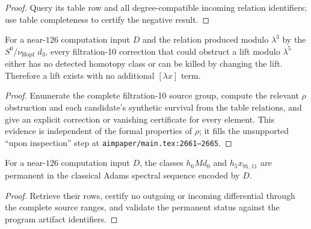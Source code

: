 \begin{proof}
  Query its table row and all degree-compatible incoming relation identifiers;
  use table completeness to certify the negative result.
\end{proof}

\begin{proposition}
  \label{evidence:nu-extension-obstruction-vanishing}
  \notready
  For a near-$126$ computation input $D$ and the relation produced modulo
  $\lambda^3$ by the $S^0/\nu_{\mathrm{Hopf}}$
  $d_3$, every filtration-10 correction that could obstruct a lift modulo
  $\lambda^5$ either has no detected homotopy class or can be killed by changing
  the lift.  Therefore a lift exists with no additional $[\lambda x]$ term.
\end{proposition}

\begin{proof}
  Enumerate the complete filtration-10 source group, compute the relevant
  $\rho$ obstruction and each candidate's synthetic survival from the table
  relations, and give an explicit correction or vanishing certificate for
  every element.  This evidence is independent of the formal properties of
  $\rho$; it fills the unsupported ``upon inspection'' step at
  \texttt{aimpaper/main.tex:2661--2665}.
\end{proof}

\begin{proposition}
  \label{evidence:stem122-permanent}
  \notready
  For a near-$126$ computation input $D$, the classes $h_6Md_0$ and
  $h_5x_{91,11}$ are permanent in the classical Adams spectral sequence
  encoded by $D$.
\end{proposition}

\begin{proof}
  Retrieve their rows, certify no outgoing or incoming differential through
  the complete source ranges, and validate the permanent status against the
  program artifact identifiers.
\end{proof}

